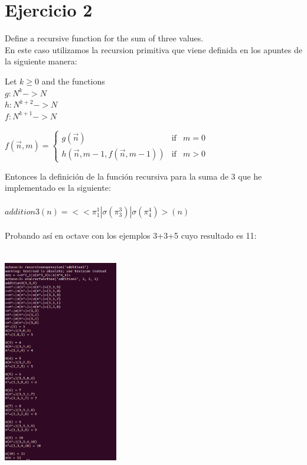 \documentclass[fleqn, 10pt]{article}
\theoremstyle{plain}
\theoremstyle{definition}
\begin{document}
\section{Ejercicio 2}

Define a recursive function for the sum of three values.
\\

En este caso utilizamos la recursion primitiva que viene definida en los apuntes de la siguiente manera:

Let $k\geq 0$ and the functions
\\
$g:{N}^k -> {N}$
\\
$h:{N}^{k+2} -> {N}$
\\
$f:{N}^{k+1}  ->  {N}$ 


\begin{center}
    $f(\vec{n},m)=\left\{ 
\begin{array}{lcc}
    g(\vec{n})                          & \text{if} & m=0\\
    h(\vec{n},m-1,f(\vec{n},m-1)) & \text{if} & m>0 
\end{array}\right.$
\end{center}

Entonces la definición de la función recursiva para la suma de 3 que he implementado es la siguiente:
\\
\\
$addition3(n)= <<\pi^1_1 | \sigma(\pi^3_3) | \sigma(\pi^4_4)> (n)$
\\
\\
Probando así en octave con los ejemplos 3+3+5 cuyo resultado es 11:
\begin{center}
\includegraphics[width=5cm, height=10cm]{2.png}
\end{center}
\end{document}
